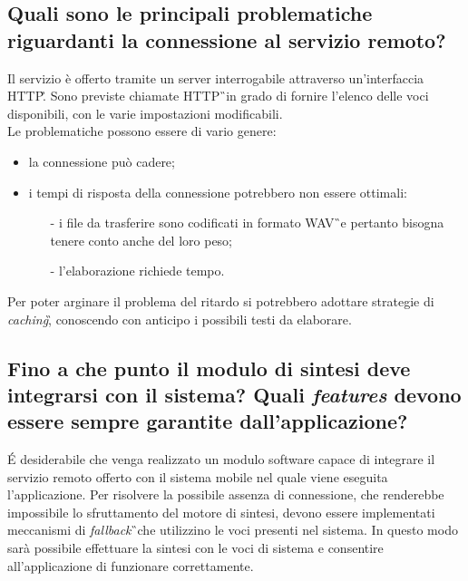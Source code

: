\subsection{Quali sono le principali problematiche riguardanti la connessione al servizio remoto?}
Il servizio è offerto tramite un server interrogabile attraverso un'interfaccia 
HTTP\G. Sono previste chiamate HTTP\G\ in grado di fornire l'elenco delle voci 
disponibili, con le varie impostazioni modificabili. \\
Le problematiche possono essere di vario genere:
\begin{itemize}
\item la connessione può cadere;
\item i tempi di risposta della connessione potrebbero non essere ottimali:
\begin{itemize}
\item[-]i file da trasferire sono codificati in formato WAV\G\ e pertanto 
bisogna tenere conto anche del loro peso;
\item[-]l'elaborazione richiede tempo.
\end{itemize}
\end{itemize}
Per poter arginare il problema del ritardo si potrebbero adottare strategie di 
\textit{caching}\G , conoscendo con anticipo i possibili testi da elaborare.


\subsection{Fino a che punto il modulo di sintesi deve integrarsi con il 
sistema? Quali \textit{features} devono essere sempre garantite 
dall'applicazione?}
\'E desiderabile che venga realizzato un modulo software capace di 
integrare il servizio remoto offerto con il sistema mobile nel quale viene 
eseguita l'applicazione. Per risolvere la possibile assenza di connessione, che 
renderebbe impossibile lo sfruttamento del motore di sintesi, devono essere 
implementati meccanismi di \textit{fallback}\G\ che utilizzino le voci presenti 
nel sistema. In questo modo sarà possibile effettuare la sintesi con le voci di 
sistema e consentire all'applicazione di funzionare correttamente.

